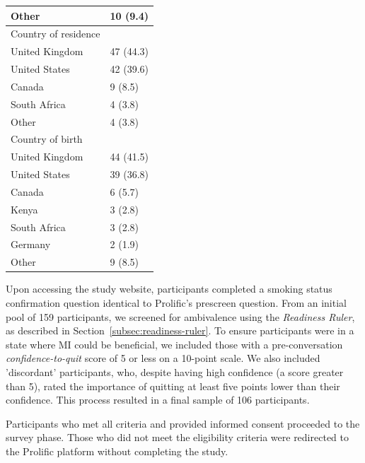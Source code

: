 \begin{table}[htbp]
\begin{tabular}{l l}
\quad Other & 10 (9.4) \\
\hline
Country of residence & \\
\quad United Kingdom & 47 (44.3) \\
\quad United States & 42 (39.6) \\
\quad Canada & 9 (8.5) \\
\quad South Africa & 4 (3.8) \\
\quad Other & 4 (3.8) \\
\hline
Country of birth & \\
\quad United Kingdom & 44 (41.5) \\
\quad United States & 39 (36.8) \\
\quad Canada & 6 (5.7) \\
\quad Kenya & 3 (2.8) \\
\quad South Africa & 3 (2.8) \\
\quad Germany & 2 (1.9) \\
\quad Other & 9 (8.5) \\
\hline
\end{tabular}
\label{tab:participant-characteristics}
\end{table}


Upon accessing the study website, participants completed a smoking status confirmation question identical to Prolific's prescreen question. From an initial pool of 159 participants, we screened for ambivalence using the \textit{Readiness Ruler}, as described in Section~\ref{subsec:readiness-ruler}. To ensure participants were in a state where MI could be beneficial, we included those with a pre-conversation \emph{confidence-to-quit} score of 5 or less on a 10-point scale. We also included 'discordant' participants, who, despite having high confidence (a score greater than 5), rated the importance of quitting at least five points lower than their confidence. This process resulted in a final sample of 106 participants.


Participants who met all criteria and provided informed consent proceeded to the survey phase. Those who did not meet the eligibility criteria were redirected to the Prolific platform without completing the study.

